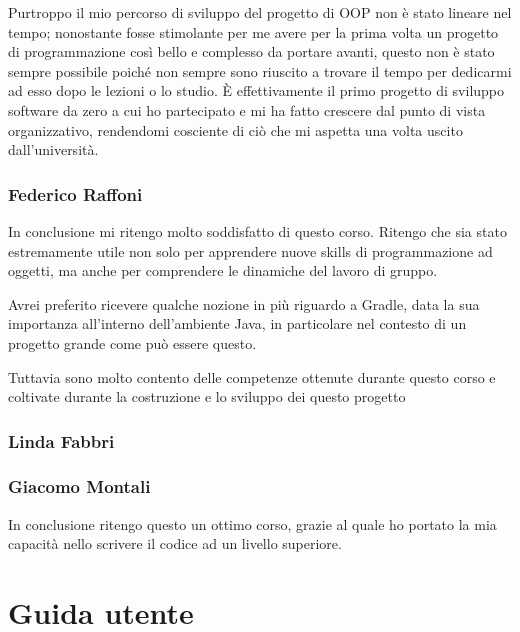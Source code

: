 \documentclass[a4paper,12pt]{report}
\begin{document}
Purtroppo il mio percorso di sviluppo del progetto di OOP non è stato lineare nel tempo; nonostante fosse stimolante per me avere per la prima volta un progetto di programmazione così bello e complesso da portare avanti, questo non è stato sempre possibile poiché non sempre sono riuscito a trovare il tempo per dedicarmi ad esso dopo le lezioni o lo studio. È effettivamente il primo progetto di sviluppo software da zero a cui ho partecipato e mi ha fatto crescere dal punto di vista organizzativo, rendendomi cosciente di ciò che mi aspetta una volta uscito dall'università.


\subsection{Federico Raffoni}
In conclusione mi ritengo molto soddisfatto di questo corso. Ritengo che sia stato estremamente utile non solo per apprendere nuove skills di programmazione ad oggetti, ma anche per comprendere le dinamiche del lavoro di gruppo.

Avrei preferito ricevere qualche nozione in più riguardo a Gradle, data la sua importanza all’interno dell’ambiente Java, in particolare nel contesto di un progetto grande come può essere questo.

Tuttavia sono molto contento delle competenze ottenute durante questo corso e coltivate durante la costruzione e lo sviluppo dei questo progetto

\subsection{Linda Fabbri}
\subsection{Giacomo Montali}
In conclusione ritengo questo un ottimo corso, grazie al quale ho portato la mia capacità nello scrivere il codice ad un livello superiore.
\appendix
\chapter{Guida utente}
\end{document}
